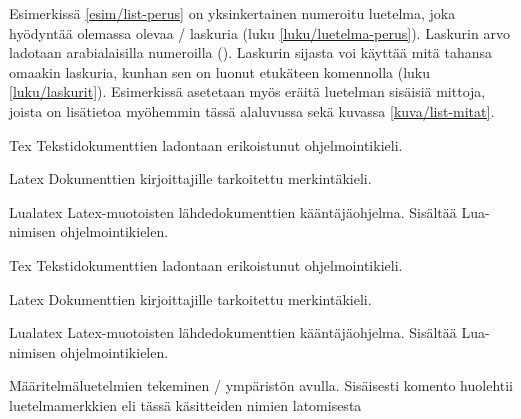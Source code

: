 Esimerkissä \ref{esim/list-perus} on yksinkertainen numeroitu luetelma,
joka hyödyntää olemassa olevaa \-/ laskuria (luku
\ref{luku/luetelma-perus}). Laskurin arvo ladotaan arabialaisilla
numeroilla (). Laskurin  sijasta voi
käyttää mitä tahansa omaakin laskuria, kunhan sen on luonut etukäteen
komennolla  (luku \ref{luku/laskurit}). Esimerkissä
asetetaan myös eräitä luetelman sisäisiä mittoja, joista on lisätietoa
myöhemmin tässä alaluvussa sekä kuvassa \ref{kuva/list-mitat}.

\begin{esimerkki*}

\begin{koodilohko}
\begin{list}{}{
    \renewcommand{\makelabel}[1]{\textsc{#1:}}
    \setlength{\leftmargin}{1.5em}
    \setlength{\labelwidth}{1.5em}
    \setlength{\itemindent}{1em}
    \setlength{\labelsep}{1em}
    \setlength{\itemsep}{.2ex}
  }
\item[Tex] Tekstidokumenttien ladontaan erikoistunut ohjelmointikieli.
\item[Latex] Dokumenttien kirjoittajille tarkoitettu merkintäkieli.
\item[Lualatex] Latex-muotoisten lähdedokumenttien kääntäjäohjelma.
  Sisältää Lua-nimi\-sen ohjelmointikielen.
\end{list}
\end{koodilohko}
  \begin{tulos}
    \begin{list}{}{
        \renewcommand{\makelabel}[1]{\textsc{#1:}}
        \setlength{\leftmargin}{1.5em}
        \setlength{\labelwidth}{1.5em}
        \setlength{\itemindent}{1em}
        \setlength{\labelsep}{1em}
        \setlength{\itemsep}{.2ex}
      }
    \item[Tex] Tekstidokumenttien ladontaan erikoistunut ohjelmointikieli.
    \item[Latex] Dokumenttien kirjoittajille tarkoitettu merkintäkieli.
    \item[Lualatex] Latex-muotoisten lähdedokumenttien kääntäjäohjelma.
      Sisältää Lua-nimi\-sen ohjelmointikielen.
    \end{list}
  \end{tulos}
  \caption{Määritelmäluetelmien tekeminen \-/ ympäristön
    avulla. Sisäisesti komento  huolehtii
    luetelmamerkkien eli tässä käsitteiden nimien latomisesta}
  \label{esim/list-makelabel}
\end{esimerkki*}

